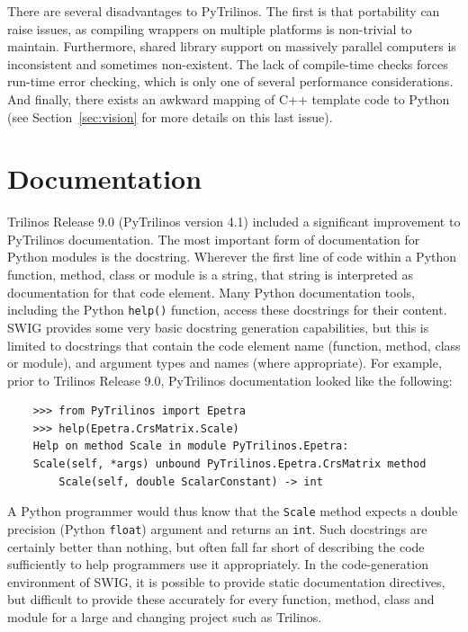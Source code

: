 \documentclass[11pt]{article}
\begin{document}
There are several disadvantages to PyTrilinos.  The first is that portability can raise issues, as compiling wrappers on multiple platforms is non-trivial to maintain.  Furthermore, shared library support on massively parallel computers is inconsistent and sometimes non-existent.  The lack of compile-time checks forces run-time error checking, which is only one of several performance considerations.  And finally, there exists an awkward mapping of C++ template code to Python (see Section~\ref{sec:vision} for more details on this last issue).

\section{Documentation}
\label{sec:documentation}

Trilinos Release 9.0 (PyTrilinos version 4.1) included a significant improvement to PyTrilinos documentation.  The most important form of documentation for Python modules is the docstring.  Wherever the first line of code within a Python function, method, class or module is a string, that string is interpreted as documentation for that code element.  Many Python documentation tools, including the Python {\tt help()} function, access these docstrings for their content.  SWIG provides some very basic docstring generation capabilities, but this is limited to docstrings that contain the code element name (function, method, class or module), and argument types and names (where appropriate).  For example, prior to Trilinos Release 9.0, PyTrilinos documentation looked like the following:

\begin{verbatim}
    >>> from PyTrilinos import Epetra
    >>> help(Epetra.CrsMatrix.Scale)
    Help on method Scale in module PyTrilinos.Epetra:
    Scale(self, *args) unbound PyTrilinos.Epetra.CrsMatrix method
        Scale(self, double ScalarConstant) -> int
\end{verbatim}

A Python programmer would thus know that the {\tt Scale} method expects a double precision (Python {\tt float}) argument and returns an {\tt int}.  Such docstrings are certainly better than nothing, but often fall far short of describing the code sufficiently to help programmers use it appropriately.  In the code-generation environment of SWIG, it is possible to provide static documentation directives, but difficult to provide these accurately for every function, method, class and module for a large and changing project such as Trilinos.
\end{document}
